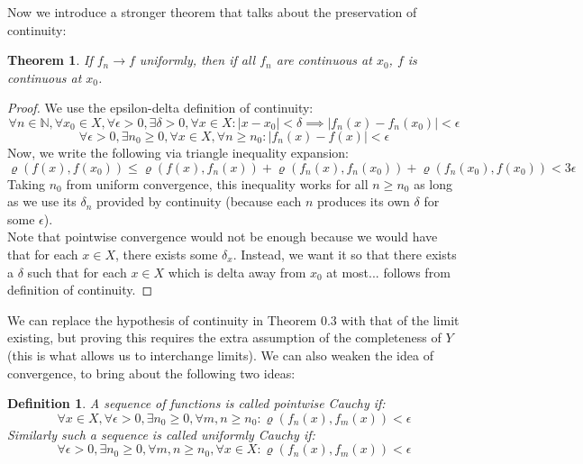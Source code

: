 \documentclass[10pt,letterpaper]{article} %
\newtheorem{thm}{Theorem}[section]
\newtheorem{defn}{Definition}[section]
\begin{document}
Now we introduce a stronger theorem that talks about the preservation of continuity:
\begin{thm}
If $f_n \xrightarrow{} f$ uniformly, then if all $f_n$ are continuous at $x_0$, $f$ is continuous at $x_0$.
\end{thm}
\begin{proof}
We use the epsilon-delta definition of continuity:
\begin{equation*}
  \forall n \in \mathbb{N}, \forall x_0 \in X, \forall \epsilon > 0, \exists \delta > 0, \forall x \in X: |x-x_0| < \delta \implies |f_n(x) - f_n(x_0)| < \epsilon
\end{equation*}
\begin{equation*}
  \forall \epsilon > 0, \exists n_0 \geqslant 0, \forall x \in X, \forall n \geqslant n_0: |f_n(x) - f(x)| < \epsilon
\end{equation*}
Now, we write the following via triangle inequality expansion:
\begin{equation*}
\varrho(f(x), f(x_0)) \leqslant \varrho(f(x), f_n(x)) + \varrho(f_n(x), f_n(x_0)) + \varrho(f_n(x_0), f(x_0)) < 3\epsilon
\end{equation*}
Taking $n_0$ from uniform convergence, this inequality works for all $n \geqslant n_0$ as long as we use its $\delta_n$ provided by continuity (because each $n$ produces its own $\delta$ for some $\epsilon$).\\

Note that pointwise convergence would not be enough because we would have that for each $x \in X$, there exists some $\delta_x$. Instead, we want it so that there exists a $\delta$ such that for each $x \in X$ which is delta away from $x_0$ at most... follows from definition of continuity.
\end{proof}
We can replace the hypothesis of continuity in Theorem 0.3 with that of the limit existing, but proving this requires the extra assumption of the completeness of $Y$ (this is what allows us to interchange limits). We can also weaken the idea of convergence, to bring about the following two ideas:
\begin{defn}
A sequence of functions is called pointwise Cauchy if:
\begin{equation*}
\forall x \in X, \forall \epsilon > 0, \exists n_0 \geqslant 0, \forall m, n \geqslant n_0: \varrho(f_n(x), f_m(x)) < \epsilon
\end{equation*}
Similarly such a sequence is called uniformly Cauchy if:
\begin{equation*}
\forall \epsilon > 0, \exists n_0 \geqslant 0, \forall m, n \geqslant n_0, \forall x \in X: \varrho(f_n(x), f_m(x)) < \epsilon
\end{equation*}
\end{defn}
\end{document}
